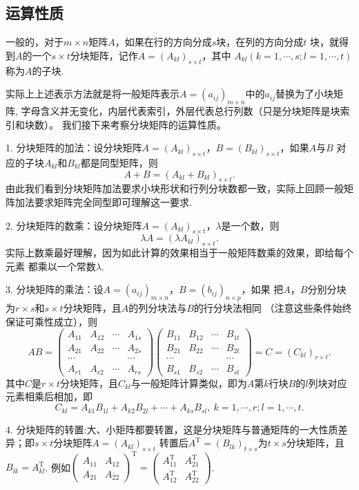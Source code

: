 \subsection{运算性质}
\begin{definition}
	一般的，对于$m \times n$矩阵$A$，如果在行的方向分成$s$块，在列的方向分成$t$
	块，就得到$A$的一个$s \times t$分块矩阵，记作$A=(A_{kl})_{s \times t}$，其中
	$A_{kl}(k=1,\cdots,s;l=1,\cdots,t)$称为$A$的子块.
\end{definition}
实际上上述表示方法就是将一般矩阵表示$A=(a_{ij})_{m \times n}$中的$a_{ij}$替换为了小块矩阵,
字母含义并无变化，内层代表索引，外层代表总行列数（只是分块矩阵是块索引和块数）。
我们接下来考察分块矩阵的运算性质。

1. 分块矩阵的加法：设分块矩阵$A=(A_{kl})_{s \times t}$，$B=(B_{kl})_{s \times t}$，如果$A$与$B$
对应的子块$A_{kl}$和$B_{kl}$都是同型矩阵，则$$A+B=(A_{kl}+B_{kl})_{s \times t}.$$
由此我们看到分块矩阵加法要求小块形状和行列分块数都一致，实际上回顾一般矩阵加法要求矩阵完全同型即可理解这一要求.

2. 分块矩阵的数乘：设分块矩阵$A=(A_{kl})_{s \times t}$，$\lambda$是一个数，则
$$\lambda A=(\lambda A_{kl})_{s \times t}.$$
实际上数乘最好理解，因为如此计算的效果相当于一般矩阵数乘的效果，即给每个元素
都乘以一个常数$\lambda$.

3. 分块矩阵的乘法：设$A=(a_{ij})_{m \times n}$，$B=(b_{ij})_{n \times p}$，如果
把$A$，$B$分别分块为$r \times s$和$s \times t$分块矩阵，且$A$的列分块法与$B$的行分块法相同
（注意这些条件始终保证可乘性成立），则
$$AB=\begin{pmatrix}
	A_{11} & A_{12} & \cdots & A_{1s} \\
	A_{21} & A_{22} & \cdots & A_{2s} \\
	\cdots &  &  & \cdots \\
	A_{r1} & A_{r2} & \cdots & A_{rs}
\end{pmatrix}\begin{pmatrix}
	B_{11} & B_{12} & \cdots & B_{1t} \\
	B_{21} & B_{22} & \cdots & B_{2t} \\
	\cdots &  &  & \cdots \\
	B_{s1} & B_{s2} & \cdots & B_{st}
\end{pmatrix}=C=(C_{kl})_{r \times t}.$$
其中$C$是$r \times t$分块矩阵，且$C_{kl}$与一般矩阵计算类似，即为$A$第$k$行块$B$的$l$列块对应元素相乘后相加，即
$$C_{kl}=A_{k1}B_{1l}+A_{k2}B_{2l}+\cdots+A_{ks}B_{sl},\ k=1,\cdots,r;l=1,\cdots,t.$$

4. 分块矩阵的转置:大、小矩阵都要转置，这是分块矩阵与普通矩阵的一大性质差异；即$s \times t$分块矩阵$A=(A_{kl})_{s \times t}$
转置后$A^\mathrm{T}=(B_{lk})_{t \times s}$为$t \times s$分块矩阵，且$B_{lk}=A_{kl}^\mathrm{T}$.
例如$\begin{pmatrix}
	A_{11} & A_{12} \\ A_{21} & A_{22}
\end{pmatrix}^\mathrm{T}=\begin{pmatrix}
	A_{11}^\mathrm{T} & A_{21}^\mathrm{T} \\ A_{12}^\mathrm{T} & A_{22}^\mathrm{T}
\end{pmatrix}$.

